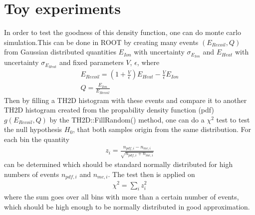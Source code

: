 \section{Toy experiments}
In order to test the goodness of this density function, one can do monte carlo simulation.This can be done in ROOT by creating many events $(E_{Recoil},Q)$ from Gaussian distributed quantities $E_{Ion}$ with uncertainty $\sigma_{E_{Ion}}$ and $E_{Heat}$ with uncertainty $\sigma_{E_{Heat}}$ and fixed parameters $V$, $\epsilon$,
where
\begin{gather}
E_{Recoil} = \left( 1 + \frac{V}{\epsilon} \right) E_{Heat} - \frac{V}{\epsilon} E_{Ion} \\
Q = \frac{E_{Ion}}{E_{Recoil}}
\end{gather}
Then by filling a TH2D histogram with these events and compare it to another TH2D histogram created from the propability density function (pdf) $g(E_{Recoil},Q)$ by the TH2D::FillRandom() method, one can do a $\chi^2$ test to test the null hypothesis $H_0$, that both samples origin from the same distribution.
For each bin the quantity
\begin{gather}
z_i = \frac{n_{pdf,i} - n_{mc,i}}{\sqrt{n_{pdf,i}+n_{mc,i}}}
\end{gather}
can be determined which should be standard normally distributed for high numbers of events $n_{pdf,i}$ and $n_{mc,i}$.
The test then is applied on
\begin{gather}
\chi^2 = \sum_i z_i^2
\end{gather}
where the sum goes over all bins with more than a certain number of events, which should be high enough to be normally distributed in good approximation. \\